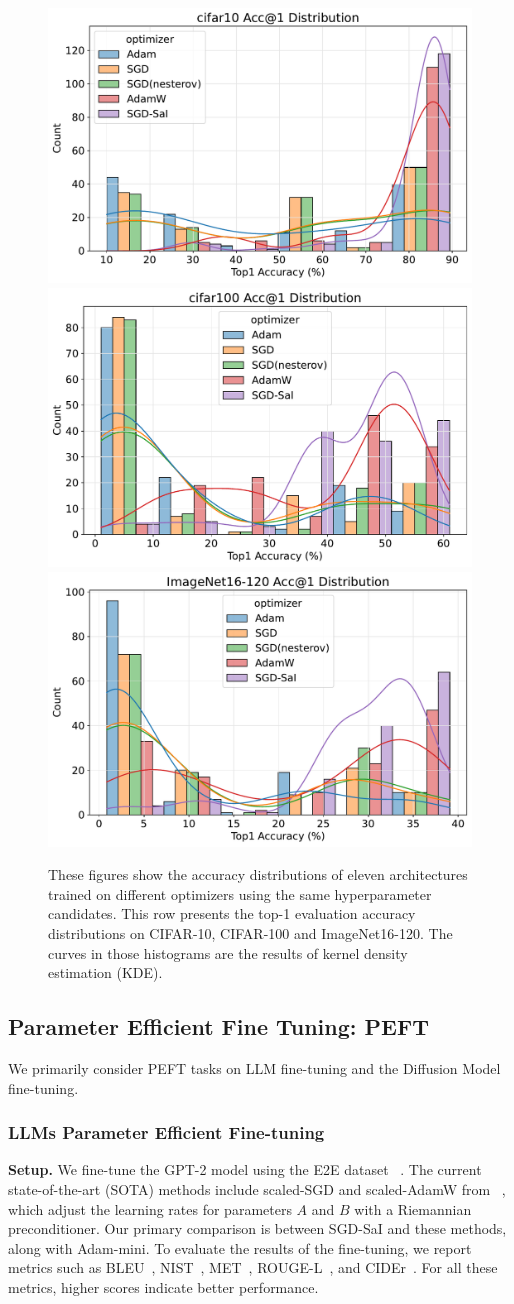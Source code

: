 \begin{figure}[!ht]
    \centering
     \includegraphics[width=.32\textwidth]{images/SSS_cifar10_valid_acc1_max_distribution.pdf}
     \includegraphics[width=.32\textwidth]{images/SSS_cifar100_valid_acc1_max_distribution.pdf}
     \includegraphics[width=.32\textwidth]{images/SSS_ImageNet16-120_valid_acc1_max_distribution.pdf}
    \caption{These figures show the accuracy distributions of eleven architectures trained on different optimizers using the same hyperparameter candidates.  This row presents the top-1 evaluation accuracy distributions on CIFAR-10, CIFAR-100 and ImageNet16-120. The curves in those histograms are the results of kernel density estimation (KDE).}
    \label{fig:fig_sss_performance_distribution_histogram}
\end{figure}


\subsection{Parameter Efficient Fine Tuning: PEFT}\label{sec:exp:finetune_peft}
We primarily consider PEFT tasks on LLM fine-tuning and the Diffusion Model fine-tuning. 

\subsubsection{LLMs Parameter Efficient Fine-tuning}

\textbf{Setup.} 
We fine-tune the GPT-2 model using the E2E dataset ~\cite{novikova2017e2e}. The current state-of-the-art (SOTA) methods include scaled-SGD and scaled-AdamW from ~\cite{zhang2024riemannian}, which adjust the learning rates for parameters $A$ and $B$ with a Riemannian preconditioner. Our primary comparison is between SGD-SaI and these methods, along with Adam-mini. To evaluate the results of the fine-tuning, we report metrics such as BLEU~\cite{papineni2002bleu}, NIST~\cite{doddington2002automatic}, MET~\cite{banerjee2005meteor}, ROUGE-L~\cite{lin2004rouge}, and CIDEr~\cite{vedantam2015cider}. For all these metrics, higher scores indicate better performance.

